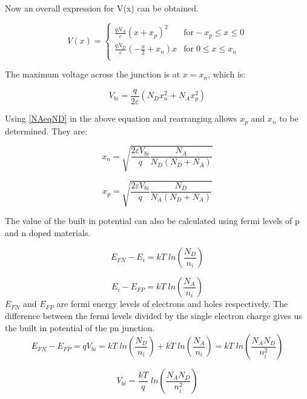 \begin{doublespace}
Now an overall expression for V(x) can be obtained.

\begin{equation}
V(x) = \begin{cases}
       \frac{qN_{A}}{\varepsilon}(x+x_{p})^2 & \text{for}  -x_{p}\leq x \leq 0 \\
       \frac{qN_{D}}{\varepsilon}(-\frac{x}{2}+x_{n})x  &  \text{for} \; 0 \leq x \leq x_{n}  \\
     \end{cases}
\end{equation}

The maximum voltage across the junction is at  $x= x_{n}$, which is:

\begin{equation}
V_{bi}=\frac{q}{2\varepsilon}(N_{D}x_{n}^2+N_{A}x_{p}^2)
\end{equation}

Using \eqref{NAeqND} in the above equation and rearranging allows $x_{p}$ and $x_{n}$ to be determined. They are:

\begin{equation}
x_{n}=\sqrt{\frac{2\varepsilon V_{bi}}{q}\frac{N_{A}}{N_{D}(N_{D}+N_{A})}}
\end{equation}

\begin{equation}
x_{p}=\sqrt{\frac{2\varepsilon V_{bi}}{q}\frac{N_{D}}{N_{A}(N_{D}+N_{A})}}
\end{equation}

The value of the built in potential can also be calculated using fermi levels of p and n doped materials.

\begin{equation}
E_{FN}-E_{i}=kT \; ln(\frac{N_{D}}{n_i})
\end{equation}

\begin{equation}
E_{i}-E_{FP}=kT \; ln(\frac{N_{A}}{n_i})
\end{equation}
$E_{FN}$ and $E_{FP}$ are fermi energy levels of electrons and holes respectively. The difference between the fermi levels divided by the single electron charge gives us the built in potential of the pn junction.
\begin{equation}
E_{FN}-E_{FP}=q V_{bi}=kT \; ln(\frac{N_{D}}{n_i})+kT \; ln(\frac{N_{A}}{n_i})=kT \; ln(\frac{N_{A}N_{D}}{n_i^2})
\end{equation}

\begin{equation}
V_{bi}=\frac{kT}{q} \; ln(\frac{N_{A}N_{D}}{n_i^2})
\end{equation}


\end{doublespace}
